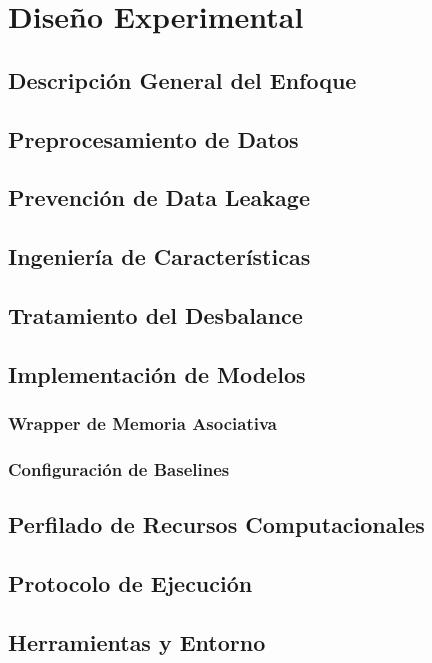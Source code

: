 
\chapter{Diseño Experimental}

\section{Descripción General del Enfoque}

\section{Preprocesamiento de Datos}

\section{Prevención de Data Leakage}

\section{Ingeniería de Características}

\section{Tratamiento del Desbalance}

\section{Implementación de Modelos}
\subsection{Wrapper de Memoria Asociativa}
\subsection{Configuración de Baselines}

\section{Perfilado de Recursos Computacionales}

\section{Protocolo de Ejecución}

\section{Herramientas y Entorno}
